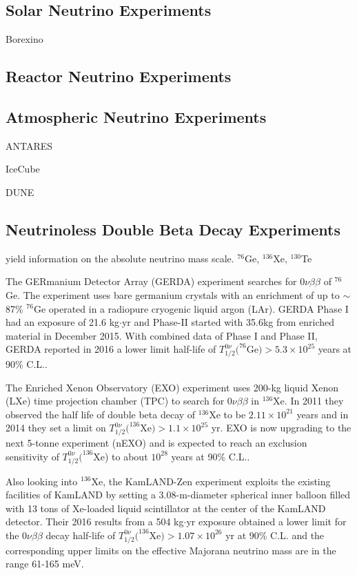 \documentclass[preprint,12pt]{elsarticle}
\begin{document}
\subsection{Solar Neutrino Experiments}

Borexino


\subsection{Reactor Neutrino Experiments}



\subsection{Atmospheric Neutrino Experiments}

ANTARES

IceCube 

DUNE

\subsection{Neutrinoless Double Beta Decay Experiments}
yield information on the absolute neutrino mass scale.
$^{76}$Ge, $^{136}$Xe, $^{130}$Te

The GERmanium Detector Array (GERDA) experiment searches for $0\nu\beta\beta$ of $^{76}$Ge. The experiment uses bare germanium crystals with an enrichment of up to $\sim$87\% $^{76}$Ge operated in a radiopure cryogenic liquid argon (LAr). GERDA Phase I had an exposure of 21.6 kg$\cdot$yr and Phase-II started with 35.6kg from enriched material in December 2015. With combined data of Phase I and Phase II, GERDA reported in 2016 a lower limit half-life of $T^{0\nu}_{1/2}(^{76}$Ge$)>5.3\times 10^{25}$ years at 90\% C.L.\cite{gerda,gerda2}.

The Enriched Xenon Observatory (EXO) experiment uses 200-kg liquid Xenon (LXe) time projection chamber (TPC) to search for $0\nu\beta\beta$ in $^{136}$Xe. In 2011 they observed the half life of double beta decay of $^{136}$Xe to be $2.11\times 10^{21}$ years and in 2014 they set a limit on $T^{0\nu}_{1/2}(^{136}$Xe$)>1.1\times 10^{25}$ yr\cite{exo}. EXO is now upgrading to the next 5-tonne experiment (nEXO) and is expected to reach an exclusion sensitivity of $T^{0\nu}_{1/2}(^{136}$Xe) to about $10^{28}$ years at 90\% C.L.\cite{nEXO}.

Also looking into $^{136}$Xe, the KamLAND-Zen experiment exploits the existing facilities of KamLAND by setting a 3.08-m-diameter spherical inner balloon filled with 13 tons of Xe-loaded liquid scintillator at the center of the KamLAND detector. Their 2016 results from a 504 kg$\cdot$yr exposure obtained a lower limit for the $0\nu\beta\beta$ decay half-life of $T^{0\nu}_{1/2}(^{136}$Xe$)>1.07\times 10^{26}$ yr at 90\% C.L. and the corresponding upper limits on the effective Majorana neutrino mass are in the range 61-165 meV\cite{kamlandZen}.
\end{document}
